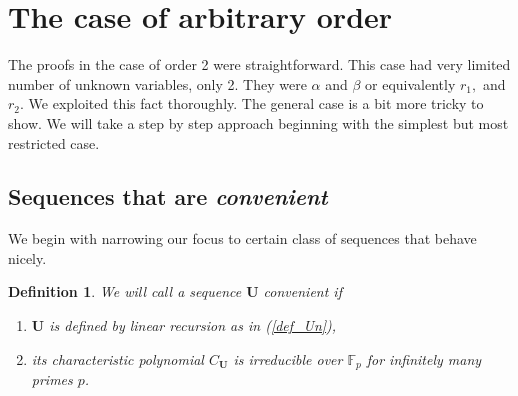 \documentclass[preprint,12pt]{elsarticle}
\newcommand{\F}{\mathbb{F}}
\newcommand{\nice}{\textit{convenient} }
\newtheorem{defin}{Definition}
\begin{document}
        
        
        
        




















\section{The case of arbitrary order}

The proofs in the case of order 2 were straightforward. This case had very limited number of unknown variables, only 2. They were $\alpha$ and $\beta$ or equivalently  $r_1,$ and  $r_2$. We exploited this fact thoroughly. The general case is a bit more tricky to show. We will take a step by step approach beginning with the simplest but most restricted case. 

\subsection{Sequences that are \nice}



We begin with narrowing our focus to certain class of sequences that behave nicely.
 
\begin{defin}\label{def_conv}
    We will call a sequence ${\mathbf U}$ \nice if
    
    \begin{enumerate}
    \item[(c1)] ${\mathbf U}$ is defined by linear recursion as in (\ref{def_Un}),
    \item[(c2)] its characteristic polynomial $C_{\mathbf U}$ is irreducible over $\F_p$ for infinitely many primes $p$.
\end{enumerate}

\end{defin}
\end{document}
